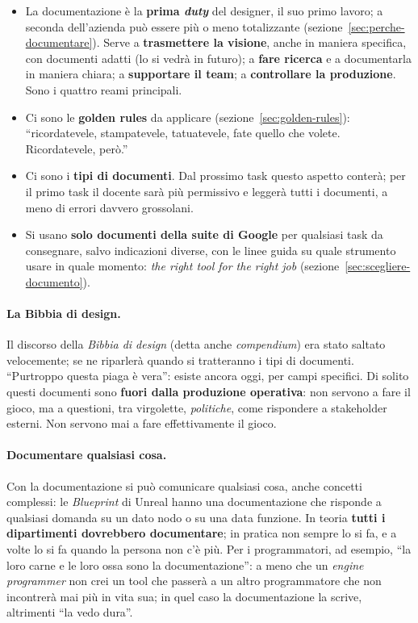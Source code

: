 \begin{itemize}
  \item La documentazione è la \textbf{prima \emph{duty}} del designer, il suo
        primo lavoro; a seconda dell'azienda può essere più o meno
        totalizzante (sezione~\ref{sec:perche-documentare}). Serve a
        \textbf{trasmettere la visione}, anche in maniera specifica, con
        documenti adatti (lo si vedrà in futuro); a \textbf{fare ricerca} e a
        documentarla in maniera chiara; a \textbf{supportare il team}; a
        \textbf{controllare la produzione}. Sono i quattro reami principali.
  \item Ci sono le \textbf{golden rules} da applicare
        (sezione~\ref{sec:golden-rules}): ``ricordatevele, stampatevele,
        tatuatevele, fate quello che volete. Ricordatevele, però.''
  \item Ci sono i \textbf{tipi di documenti}. Dal prossimo task questo aspetto
        conterà; per il primo task il docente sarà più permissivo e leggerà
        tutti i documenti, a meno di errori davvero grossolani.
  \item Si usano \textbf{solo documenti della suite di Google} per qualsiasi
        task da consegnare, salvo indicazioni diverse, con le linee guida su
        quale strumento usare in quale momento: \emph{the right tool for the
        right job} (sezione~\ref{sec:scegliere-documento}).
\end{itemize}

\paragraph{La Bibbia di design.} Il discorso della \emph{Bibbia di design}
(detta anche \emph{compendium}) era stato saltato velocemente; se ne
riparlerà quando si tratteranno i tipi di documenti. ``Purtroppo questa piaga
è vera'': esiste ancora oggi, per campi specifici. Di solito questi documenti
sono \textbf{fuori dalla produzione operativa}: non servono a fare il gioco,
ma a questioni, tra virgolette, \emph{politiche}, come rispondere a
stakeholder esterni. Non servono mai a fare effettivamente il gioco.

\paragraph{Documentare qualsiasi cosa.} Con la documentazione si può
comunicare qualsiasi cosa, anche concetti complessi: le \emph{Blueprint} di
Unreal hanno una documentazione che risponde a qualsiasi domanda su un dato
nodo o su una data funzione. In teoria \textbf{tutti i dipartimenti
dovrebbero documentare}; in pratica non sempre lo si fa, e a volte lo si fa
quando la persona non c'è più. Per i programmatori, ad esempio, ``la loro
carne e le loro ossa sono la documentazione'': a meno che un \emph{engine
programmer} non crei un tool che passerà a un altro programmatore che non
incontrerà mai più in vita sua; in quel caso la documentazione la scrive,
altrimenti ``la vedo dura''.

